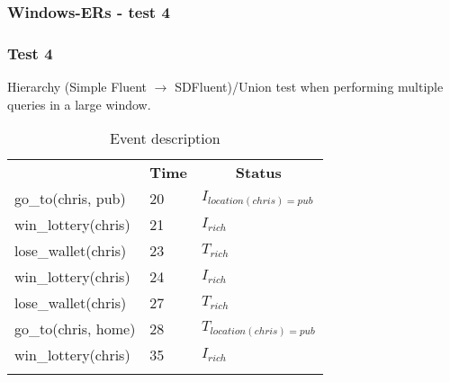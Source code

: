 \documentclass[8pt]{beamer}
\begin{document}
\begin{frame}
    \frametitle{Windows-ERs - test 4}
    \subsubsection{Test 4}
    \small
    Hierarchy (Simple Fluent $\rightarrow$ SDFluent)/Union test when performing multiple queries in a large window.\linebreak
    \begin{minipage}{0.48\linewidth}
        \begin{table}[t!]
            \caption{Event description}
            \begin{center}

                \begin{tabular}{lll}
                    \hline\noalign{\smallskip}
                    \multicolumn{1}{l}{\textbf{Event}} & \multicolumn{1}{c}{\textbf{Time}} & \multicolumn{1}{c}{\textbf{Status}}  \\
                    go\_to(chris, pub)& 20 & $I_{location(chris)=pub}$\\
                    win\_lottery(chris)&21 &$I_{rich}$\\
                    lose\_wallet(chris)& 23 &$T_{rich}$\\
                    win\_lottery(chris)& 24 &$I_{rich}$\\
                    lose\_wallet(chris)& 27 &$T_{rich}$\\
                    go\_to(chris, home)& 28 &$T_{location(chris)=pub}$\\
                    win\_lottery(chris)& 35&$I_{rich}$\\
                    \noalign{\smallskip}
                    \hline
                \end{tabular}
            \end{center}
        \end{table}
    \end{minipage}
    \begin{minipage}{0.48\linewidth}


\end{minipage}
\end{frame}
\end{document}
